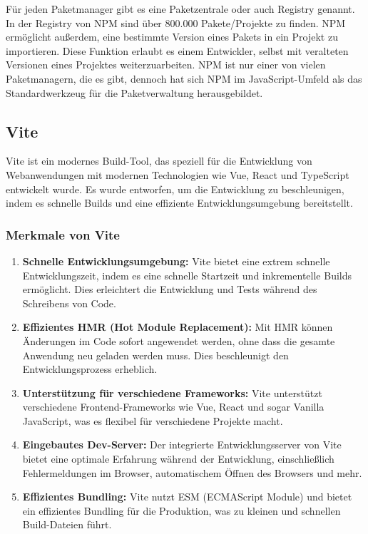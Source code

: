 Für jeden Paketmanager gibt es eine Paketzentrale oder auch Registry genannt. In der Registry von \acs{NPM} sind über 800.000 Pakete/Projekte zu finden. \acs{NPM} ermöglicht außerdem, eine bestimmte Version eines Pakets in ein Projekt zu importieren. Diese Funktion erlaubt es einem Entwickler, selbst mit veralteten Versionen eines Projektes weiterzuarbeiten. \acs{NPM} ist nur einer von vielen Paketmanagern, die es gibt, dennoch hat sich \acs{NPM} im JavaScript-Umfeld als das Standardwerkzeug für die Paketverwaltung herausgebildet.\cite{npm}

\subsection{Vite}

Vite ist ein modernes Build-Tool, das speziell für die Entwicklung von Webanwendungen mit modernen Technologien wie Vue, React und TypeScript entwickelt wurde. Es wurde entworfen, um die Entwicklung zu beschleunigen, indem es schnelle Builds und eine effiziente Entwicklungsumgebung bereitstellt. \cite{vitejs}

\subsubsection{Merkmale von Vite}

\begin{enumerate}
    \item \textbf{Schnelle Entwicklungsumgebung:} Vite bietet eine extrem schnelle Entwicklungszeit, indem es eine schnelle Startzeit und inkrementelle Builds ermöglicht. Dies erleichtert die Entwicklung und Tests während des Schreibens von Code.

    \item \textbf{Effizientes HMR (Hot Module Replacement):} Mit HMR können Änderungen im Code sofort angewendet werden, ohne dass die gesamte Anwendung neu geladen werden muss. Dies beschleunigt den Entwicklungsprozess erheblich.

    \item \textbf{Unterstützung für verschiedene Frameworks:} Vite unterstützt verschiedene Frontend-Frameworks wie Vue, React und sogar Vanilla JavaScript, was es flexibel für verschiedene Projekte macht.

    \item \textbf{Eingebautes Dev-Server:} Der integrierte Entwicklungsserver von Vite bietet eine optimale Erfahrung während der Entwicklung, einschließlich Fehlermeldungen im Browser, automatischem Öffnen des Browsers und mehr.

    \item \textbf{Effizientes Bundling:} Vite nutzt ESM (ECMAScript Module) und bietet ein effizientes Bundling für die Produktion, was zu kleinen und schnellen Build-Dateien führt.
\end{enumerate}

